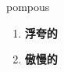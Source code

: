 
\begin{frame}
{\huge pompous}
\begin{center}
\begin{enumerate}\Large
  \item \textbf{浮夸的}
  \item \textbf{傲慢的}
\end{enumerate}
\end{center}
\end{frame}
